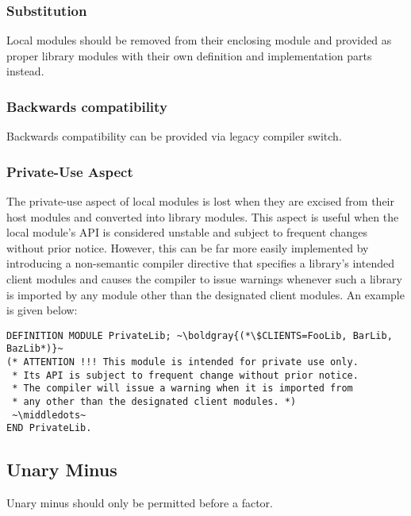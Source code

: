\documentclass[10pt,a4paper]{article} %
\newcommand\boldgray[1]{\textcolor{gray}{\textbf{#1}}}
\newcommand\middledots{\textperiodcentered\textperiodcentered\textperiodcentered}
\begin{document}
\subsubsection{Substitution}
Local modules should be removed from their enclosing module and provided as proper library modules with their own definition and implementation parts instead.

\subsubsection{Backwards compatibility}

Backwards compatibility can be provided via legacy compiler switch.

\subsubsection{Private-Use Aspect}

The private-use aspect of local modules is lost when they are excised from their host modules and converted into library modules. This aspect is useful when the local module's API is considered unstable and subject to frequent changes without prior notice. However, this can be far more easily implemented by introducing a \gls{non-semantic compiler directive} that specifies a library's intended client modules and causes the compiler to issue warnings whenever such a library is imported by any module other than the designated client modules. An example is given below:

\lstset{style=modula2}
\begin{lstlisting}[escapechar=~]
DEFINITION MODULE PrivateLib; ~\boldgray{(*\$CLIENTS=FooLib, BarLib, BazLib*)}~
(* ATTENTION !!! This module is intended for private use only.
 * Its API is subject to frequent change without prior notice.
 * The compiler will issue a warning when it is imported from
 * any other than the designated client modules. *)
 ~\middledots~
END PrivateLib.
\end{lstlisting}


\subsection{Unary Minus}

Unary minus should only be permitted before a factor.
\end{document}
